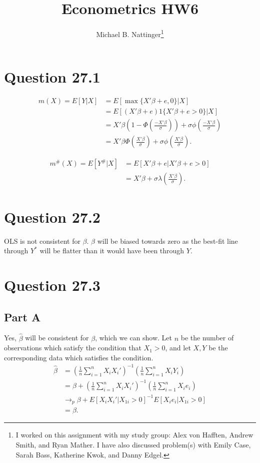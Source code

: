 \documentclass[11pt]{article} %
\title{Econometrics HW6}
\author{Michael B. Nattinger\footnote{I worked on this assignment with my study group: Alex von Hafften, Andrew Smith, and Ryan Mather. I have also discussed problem(s) with Emily Case, Sarah Bass, Katherine Kwok, and Danny Edgel.}}
\begin{document}
\maketitle

\section{Question 27.1}
\begin{align*} %
m(X) = E[Y|X] &= E[\max\{ X'\beta + e,0\}|X] \\
&= E[(X'\beta+e) 1\{X'\beta+e >0 \}|X]\\
&= X'\beta\left(1-\Phi\left(\frac{ -X'\beta}{\sigma}\right)\right) + \sigma \phi\left(\frac{-X'\beta}{\sigma}\right) \\
&= X'\beta\Phi\left(\frac{ X'\beta}{\sigma}\right)+ \sigma \phi\left(\frac{X'\beta}{\sigma}\right).
\end{align*}

\begin{align*} %
m^{\#}(X) = E[Y^{\#}|X] &= E[X'\beta+e|X'\beta+e>0]\\
&= X'\beta + \sigma\lambda\left(\frac{X'\beta}{\sigma}\right).
\end{align*}
\section{Question 27.2}
OLS is not consistent for $\beta$. $\beta $ will be biased towards zero as the best-fit line through $Y^{*}$ will be flatter than it would have been through $Y$.
\section{Question 27.3}
\subsection{Part A}
Yes, $\hat{\beta}$ will be consistent for $\beta$, which we can show. Let $n$ be the number of observations which satisfy the condition that $X_1>0$, and let $X,Y$ be the corresponding data which satisfies the condition. 
\begin{align*}
\hat{\beta} &= \left( \frac{1}{n} \sum_{i=1}^n X_i X_i' \right)^{-1} \left( \frac{1}{n} \sum_{i=1}^n X_i Y_i\right) \\
&= \beta + \left( \frac{1}{n} \sum_{i=1}^n X_i X_i' \right)^{-1} \left( \frac{1}{n} \sum_{i=1}^n X_i e_i\right) \\
&\rightarrow_p \beta + E[X_iX_i'|X_{1i}>0]^{-1}E[X_ie_i|X_{1i}>0]\\
&= \beta.
\end{align*}
\end{document}
